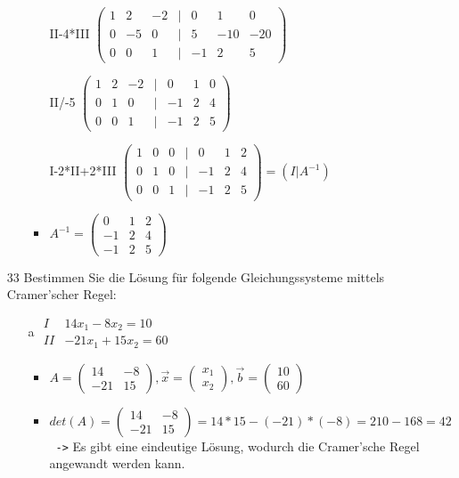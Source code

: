 \documentclass{article}
\begin{document}
\begin{itemize}
\begin{itemize}
\begin{itemize}
				\item[II-4*III]{$\begin{pmatrix} 1 & 2 & -2 & | & 0 & 1 & 0 \\ 0 & -5 & 0 & | & 5 & -10 & -20 \\ 0 & 0 & 1 & | & -1 & 2 & 5 \end{pmatrix}$}
				\item[II/-5]{$\begin{pmatrix} 1 & 2 & -2 & | & 0 & 1 & 0 \\ 0 & 1 & 0 & | & -1 & 2 & 4 \\ 0 & 0 & 1 & | & -1 & 2 & 5 \end{pmatrix}$}
				\item[I-2*II+2*III]{$\begin{pmatrix} 1 & 0 & 0 & | & 0 & 1 & 2 \\ 0 & 1 & 0 & | & -1 & 2 & 4 \\ 0 & 0 & 1 & | & -1 & 2 & 5 \end{pmatrix}=(I|A^{-1})$}
				\item{$A^{-1}=\begin{pmatrix} 0 & 1 & 2 \\ -1 & 2 & 4 \\ -1 & 2 & 5 \end{pmatrix}$}
			\end{itemize}
		\end{itemize}
		\item[33]{Bestimmen Sie die Lösung für folgende Gleichungssysteme mittels Cramer'scher Regel:}
		\begin{itemize}
			\item[a]{$\begin{matrix} I & 14x_1-8x_2=10 \\ II & -21x_1+15x_2=60 \end{matrix}$}
			\begin{itemize}
				\item{$A=\begin{pmatrix} 14 & -8 \\ -21 & 15 \end{pmatrix}, \vec{x}=\begin{pmatrix} x_1 \\ x_2 \end{pmatrix}, \vec{b}=\begin{pmatrix} 10 \\ 60 \end{pmatrix}$}
				\item{$det(A)=\begin{pmatrix} 14 & -8 \\ -21 & 15 \end{pmatrix}=14*15-(-21)*(-8)=210-168=42$ \texttt{ ->} Es gibt eine eindeutige Lösung, wodurch die Cramer'sche Regel angewandt werden kann.}

\end{itemize}
\end{itemize}
\end{itemize}
\end{document}
